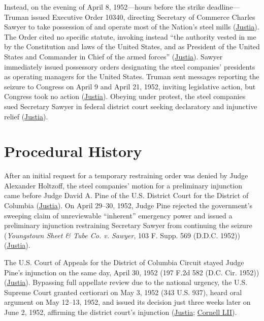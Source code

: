 \documentclass[12pt]{article}
\begin{document}
Instead, on the evening of April 8, 1952---hours before the strike deadline---Truman issued Executive Order 10340, directing Secretary of Commerce Charles Sawyer to take possession of and operate most of the Nation's steel mills (\href{https://supreme.justia.com/cases/federal/us/343/579/}{Justia}). The Order cited no specific statute, invoking instead ``the authority vested in me by the Constitution and laws of the United States, and as President of the United States and Commander in Chief of the armed forces'' (\href{https://supreme.justia.com/cases/federal/us/343/579/}{Justia}). Sawyer immediately issued possessory orders designating the steel companies' presidents as operating managers for the United States. Truman sent messages reporting the seizure to Congress on April 9 and April 21, 1952, inviting legislative action, but Congress took no action (\href{https://supreme.justia.com/cases/federal/us/343/579/}{Justia}). Obeying under protest, the steel companies sued Secretary Sawyer in federal district court seeking declaratory and injunctive relief (\href{https://supreme.justia.com/cases/federal/us/343/579/}{Justia}).

\section{Procedural History}
After an initial request for a temporary restraining order was denied by Judge Alexander Holtzoff, the steel companies' motion for a preliminary injunction came before Judge David A. Pine of the U.S. District Court for the District of Columbia (\href{https://supreme.justia.com/cases/federal/us/343/579/}{Justia}). On April 29--30, 1952, Judge Pine rejected the government's sweeping claim of unreviewable ``inherent'' emergency power and issued a preliminary injunction restraining Secretary Sawyer from continuing the seizure (\textit{Youngstown Sheet \& Tube Co. v. Sawyer}, 103 F. Supp. 569 (D.D.C. 1952)) (\href{https://supreme.justia.com/cases/federal/us/343/579/}{Justia}).

The U.S. Court of Appeals for the District of Columbia Circuit stayed Judge Pine's injunction on the same day, April 30, 1952 (197 F.2d 582 (D.C. Cir. 1952)) (\href{https://supreme.justia.com/cases/federal/us/343/579/}{Justia}). Bypassing full appellate review due to the national urgency, the U.S. Supreme Court granted certiorari on May 3, 1952 (343 U.S. 937), heard oral argument on May 12--13, 1952, and issued its decision just three weeks later on June 2, 1952, affirming the district court's injunction (\href{https://supreme.justia.com/cases/federal/us/343/579/}{Justia}; \href{https://www.law.cornell.edu/supremecourt/text/343/579}{Cornell LII}).
\end{document}
